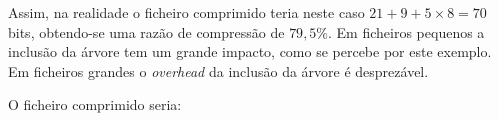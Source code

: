  Assim, na realidade o ficheiro comprimido teria neste caso $21 + 9 + 5 \times 8 = 70$ bits, obtendo-se uma razão de compressão de $79,5\%$. Em ficheiros pequenos a inclusão da árvore tem um grande impacto, como se percebe por este exemplo. Em ficheiros grandes o \textit{overhead} da inclusão da árvore é desprezável.
 
 O ficheiro comprimido seria: \\[5mm]
 \par
{} \par


